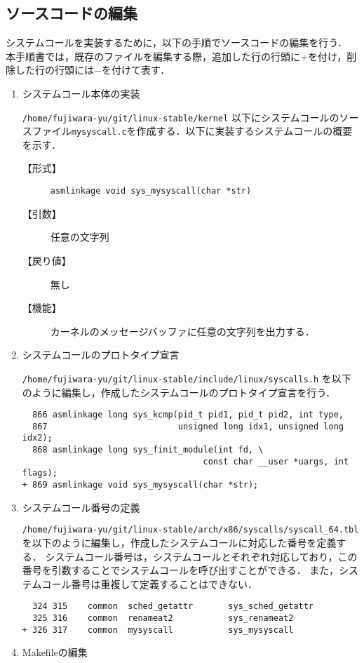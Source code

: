 \documentclass[12pt]{jsarticle}
\begin{document}
\subsection{ソースコードの編集}
システムコールを実装するために，以下の手順でソースコードの編集を行う．
本手順書では，既存のファイルを編集する際，追加した行の行頭に$+$を付け，削除した行の行頭には$-$を付けて表す．
\begin{enumerate}

\item システムコール本体の実装

\verb|/home/fujiwara-yu/git/linux-stable/kernel| 以下にシステムコールのソースファイル\verb|mysyscall.c|を作成する．以下に実装するシステムコールの概要を示す．
\begin{description}
\item[【形式】]\verb|asmlinkage void sys_mysyscall(char *str)|

\item[【引数】]任意の文字列

\item [【戻り値】]無し

\item [【機能】]カーネルのメッセージバッファに任意の文字列を出力する．

\end{description}

\item システムコールのプロトタイプ宣言

\verb|/home/fujiwara-yu/git/linux-stable/include/linux/syscalls.h| を以下のように編集し，作成したシステムコールのプロトタイプ宣言を行う．
\begin{verbatim}
  866 asmlinkage long sys_kcmp(pid_t pid1, pid_t pid2, int type,
  867                          unsigned long idx1, unsigned long idx2);
  868 asmlinkage long sys_finit_module(int fd, \ 
                                    const char __user *uargs, int flags);
+ 869 asmlinkage void sys_mysyscall(char *str);
\end{verbatim}
\item システムコール番号の定義

\verb|/home/fujiwara-yu/git/linux-stable/arch/x86/syscalls/syscall_64.tbl| を以下のように編集し，作成したシステムコールに対応した番号を定義する．
システムコール番号は，システムコールとそれぞれ対応しており，この番号を引数することでシステムコールを呼び出すことができる．
また，システムコール番号は重複して定義することはできない．
\begin{verbatim}
  324 315    common  sched_getattr       sys_sched_getattr
  325 316    common  renameat2           sys_renameat2
+ 326 317    common  mysyscall           sys_mysyscall
\end{verbatim}
\item Makefileの編集


\end{enumerate}
\end{document}
